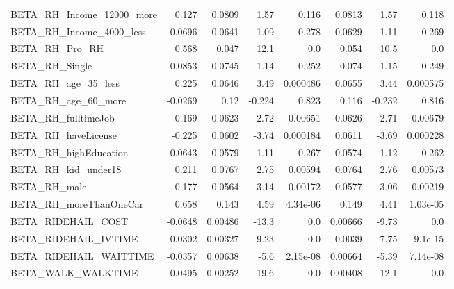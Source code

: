 \begin{tabular}{lrrrrrrr}
BETA\_RH\_Income\_12000\_more    &    0.127 &   0.0809 &    1.57 &    0.116 &        0.0813 &         1.57 &         0.118 \\
BETA\_RH\_Income\_4000\_less     &  -0.0696 &   0.0641 &   -1.09 &    0.278 &        0.0629 &        -1.11 &         0.269 \\
BETA\_RH\_Pro\_RH               &    0.568 &    0.047 &    12.1 &      0.0 &         0.054 &         10.5 &           0.0 \\
BETA\_RH\_Single               &  -0.0853 &   0.0745 &   -1.14 &    0.252 &         0.074 &        -1.15 &         0.249 \\
BETA\_RH\_age\_35\_less          &    0.225 &   0.0646 &    3.49 & 0.000486 &        0.0655 &         3.44 &      0.000575 \\
BETA\_RH\_age\_60\_more          &  -0.0269 &     0.12 &  -0.224 &    0.823 &         0.116 &       -0.232 &         0.816 \\
BETA\_RH\_fulltimeJob          &    0.169 &   0.0623 &    2.72 &  0.00651 &        0.0626 &         2.71 &       0.00679 \\
BETA\_RH\_haveLicense          &   -0.225 &   0.0602 &   -3.74 & 0.000184 &        0.0611 &        -3.69 &      0.000228 \\
BETA\_RH\_highEducation        &   0.0643 &   0.0579 &    1.11 &    0.267 &        0.0574 &         1.12 &         0.262 \\
BETA\_RH\_kid\_under18          &    0.211 &   0.0767 &    2.75 &  0.00594 &        0.0764 &         2.76 &       0.00573 \\
BETA\_RH\_male                 &   -0.177 &   0.0564 &   -3.14 &  0.00172 &        0.0577 &        -3.06 &       0.00219 \\
BETA\_RH\_moreThanOneCar       &    0.658 &    0.143 &    4.59 & 4.34e-06 &         0.149 &         4.41 &      1.03e-05 \\
BETA\_RIDEHAIL\_COST           &  -0.0648 &  0.00486 &   -13.3 &      0.0 &       0.00666 &        -9.73 &           0.0 \\
BETA\_RIDEHAIL\_IVTIME         &  -0.0302 &  0.00327 &   -9.23 &      0.0 &        0.0039 &        -7.75 &       9.1e-15 \\
BETA\_RIDEHAIL\_WAITTIME       &  -0.0357 &  0.00638 &    -5.6 & 2.15e-08 &       0.00664 &        -5.39 &      7.14e-08 \\
BETA\_WALK\_WALKTIME           &  -0.0495 &  0.00252 &   -19.6 &      0.0 &       0.00408 &        -12.1 &           0.0 \\

\end{tabular}
